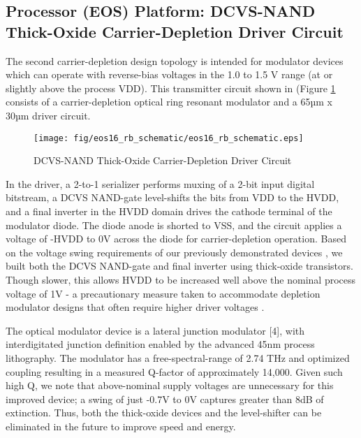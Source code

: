 \subsection{Processor (EOS) Platform: DCVS-NAND Thick-Oxide Carrier-Depletion Driver Circuit}

The second carrier-depletion design topology is intended for modulator devices which can operate with reverse-bias voltages in the 1.0 to 1.5 V range (at or slightly above the process VDD).  This transmitter circuit shown in  (Figure \ref{fig:eos16_rb_schematic} consists of a carrier-depletion optical ring resonant modulator and a 65µm x 30µm driver circuit. 

	\begin{figure}[H]
		\begin{center}
			\texttt{[image: fig/eos16\_rb\_schematic/eos16\_rb\_schematic.eps]}
			\caption{\label{fig:eos16_rb_schematic}DCVS-NAND Thick-Oxide Carrier-Depletion Driver Circuit}
		\end{center}
	\end{figure}

 In the driver, a 2-to-1 serializer performs muxing of a 2-bit input digital bitstream, a DCVS NAND-gate level-shifts the bits from VDD to the HVDD, and a final inverter in the HVDD domain drives the cathode terminal of the modulator diode. The diode anode is shorted to VSS, and the circuit applies a voltage of -HVDD to 0V across the diode for carrier-depletion operation. Based on the voltage swing requirements of our previously demonstrated devices \cite{shainline_opticsletters13}, we built both the DCVS NAND-gate and final inverter using thick-oxide transistors. Though slower, this allows HVDD to be increased well above the nominal process voltage of 1V - a precautionary measure taken to accommodate depletion modulator designs that often require higher driver voltages \cite{buckwalter_jssc12} \cite{zheng_ptl12}. 

The optical modulator device is a lateral junction modulator [4], with interdigitated junction definition enabled by the advanced 45nm process lithography. The modulator has a free-spectral-range of 2.74 THz and optimized coupling resulting in a measured Q-factor of approximately 14,000. Given such high Q, we note that above-nominal supply voltages are unnecessary for this improved device; a swing of just -0.7V to 0V captures greater than 8dB of extinction. Thus, both the thick-oxide devices and the level-shifter can be eliminated in the future to improve speed and energy.


